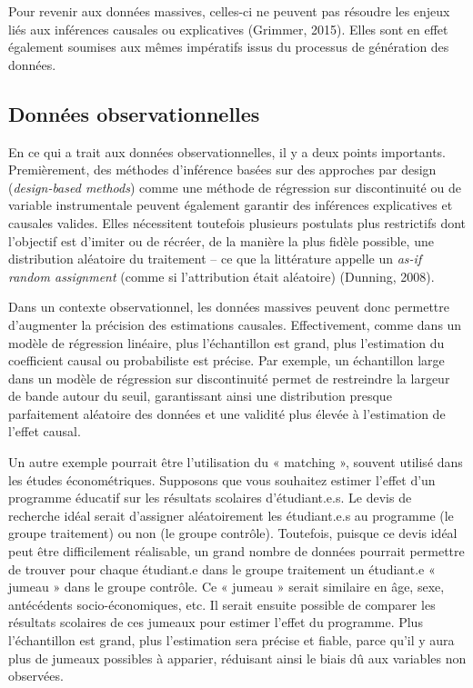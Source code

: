 \documentclass[
  letterpaper,
  DIV=11,
  numbers=noendperiod]{scrreprt}
\begin{document}
Pour revenir aux données massives, celles-ci ne peuvent pas résoudre les
enjeux liés aux inférences causales ou explicatives (Grimmer, 2015).
Elles sont en effet également soumises aux mêmes impératifs issus du
processus de génération des données.

\subsection*{Données
observationnelles}\label{donnuxe9es-observationnelles}

En ce qui a trait aux données observationnelles, il y a deux points
importants. Premièrement, des méthodes d'inférence basées sur des
approches par design (\emph{design-based methods}) comme une méthode de
régression sur discontinuité ou de variable instrumentale peuvent
également garantir des inférences explicatives et causales valides.
Elles nécessitent toutefois plusieurs postulats plus restrictifs dont
l'objectif est d'imiter ou de récréer, de la manière la plus fidèle
possible, une distribution aléatoire du traitement -- ce que la
littérature appelle un \emph{as-if random assignment} (comme si
l'attribution était aléatoire) (Dunning, 2008).

Dans un contexte observationnel, les données massives peuvent donc
permettre d'augmenter la précision des estimations causales.
Effectivement, comme dans un modèle de régression linéaire, plus
l'échantillon est grand, plus l'estimation du coefficient causal ou
probabiliste est précise. Par exemple, un échantillon large dans un
modèle de régression sur discontinuité permet de restreindre la largeur
de bande autour du seuil, garantissant ainsi une distribution presque
parfaitement aléatoire des données et une validité plus élevée à
l'estimation de l'effet causal.

Un autre exemple pourrait être l'utilisation du « matching », souvent
utilisé dans les études économétriques. Supposons que vous souhaitez
estimer l'effet d'un programme éducatif sur les résultats scolaires
d'étudiant.e.s. Le devis de recherche idéal serait d'assigner
aléatoirement les étudiant.e.s au programme (le groupe traitement) ou
non (le groupe contrôle). Toutefois, puisque ce devis idéal peut être
difficilement réalisable, un grand nombre de données pourrait permettre
de trouver pour chaque étudiant.e dans le groupe traitement un
étudiant.e « jumeau » dans le groupe contrôle. Ce « jumeau » serait
similaire en âge, sexe, antécédents socio-économiques, etc. Il serait
ensuite possible de comparer les résultats scolaires de ces jumeaux pour
estimer l'effet du programme. Plus l'échantillon est grand, plus
l'estimation sera précise et fiable, parce qu'il y aura plus de jumeaux
possibles à apparier, réduisant ainsi le biais dû aux variables non
observées.
\end{document}
